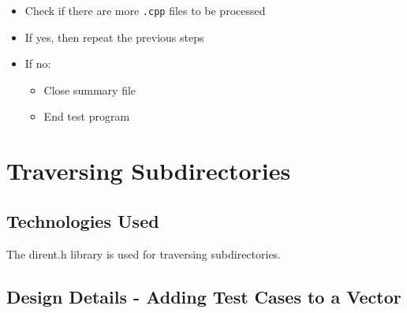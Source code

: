 \begin{itemize}
\item Check if there are more {\tt .cpp} files to be processed
  \item If yes, then repeat the previous steps
  \item If no:
	\begin{itemize}
 		\item Close summary file
 		\item End test program
	\end{itemize}
\end{itemize}


\section{Traversing Subdirectories }

\subsection{Technologies  Used}
The dirent.h library is used for traversing subdirectories.

\subsection{Design Details - Adding Test Cases to a Vector}

